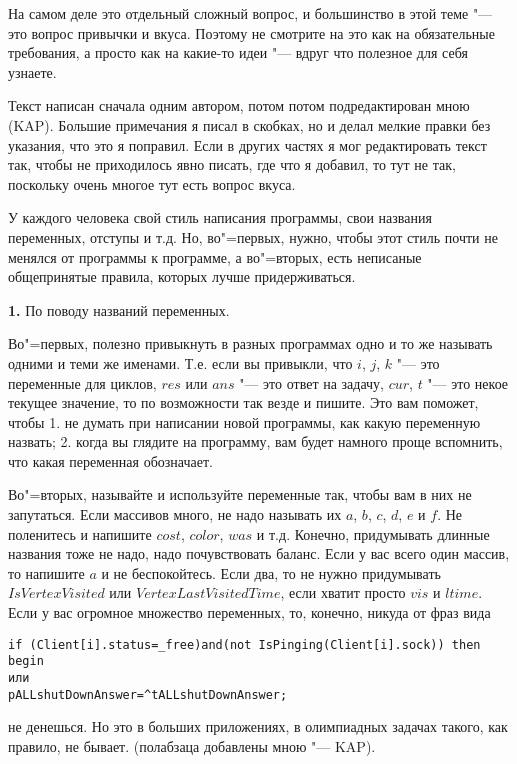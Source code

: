 На самом деле это отдельный сложный вопрос, и большинство в этой теме "--- это вопрос привычки и вкуса. Поэтому не смотрите на это как на обязательные требования, а просто как на какие-то идеи "--- вдруг что полезное для себя узнаете.

Текст написан сначала одним автором, потом потом подредактирован мною (KAP). Большие примечания я писал в скобках, 
но и делал мелкие правки без указания, что это я поправил. Если в других частях я мог 
редактировать текст так, чтобы не приходилось явно писать, где что я добавил, то тут не так, 
поскольку очень многое тут есть вопрос вкуса. 

У каждого человека свой стиль написания программы, свои названия переменных, отступы и т.д. Но, во"=первых, 
нужно, чтобы этот стиль почти не менялся от программы к программе, а во"=вторых, есть неписаные общепринятые 
правила, которых лучше придерживаться. 

\textbf{1.} По поводу названий переменных.

 Во"=первых, полезно привыкнуть в разных программах одно и 
то же называть одними и теми же 
именами. Т.е. если вы привыкли, что $i$, $j$, $k$ "--- это переменные для циклов, $res$ или $ans$ "--- это ответ на задачу,
$cur$, $t$ "--- это некое текущее значение, то по возможности так везде и пишите. Это вам поможет, 
чтобы 1. не думать при написании новой программы, как какую переменную назвать; 2. когда вы глядите на 
программу, вам будет намного проще вспомнить, что какая переменная обозначает.

Во"=вторых, называйте и используйте переменные так, чтобы вам в них не запутаться. Если массивов 
много, не надо называть их $a$, $b$, $c$, $d$, $e$ и $f$. Не  
поленитесь и напишите $cost$, $color$, $was$ и т.д. Конечно, придумывать длинные названия тоже не 
надо, надо почувствовать баланс. Если у вас всего один массив, то напишите $a$ и не беспокойтесь. 
Если два, то не нужно придумывать $IsVertexVisited$ или $VertexLastVisitedTime$, если хватит просто 
$vis$ и $ltime$. Если у вас огромное множество переменных, то, конечно, никуда от фраз вида
\begin{codesampleo}\begin{verbatim}
if (Client[i].status=_free)and(not IsPinging(Client[i].sock)) then begin
или
pALLshutDownAnswer=^tALLshutDownAnswer;
\end{verbatim}\end{codesampleo}
\noindent не денешься. Но это в больших приложениях, в олимпиадных задачах такого, как правило, не бывает. (полабзаца 
добавлены мною "--- KAP).

